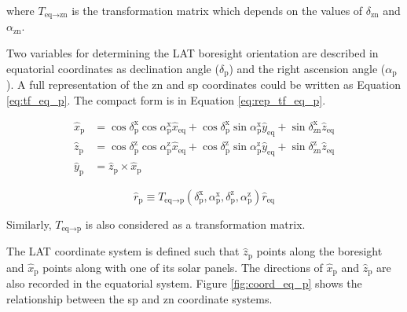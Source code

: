 where $T_{\text{eq}\rightarrow\text{zn}}$ is the transformation matrix which depends on the
values of $\delta_\text{zn}$ and $\alpha_\text{zn}$.


Two variables for determining the LAT boresight
orientation are described 
in equatorial coordinates as declination angle ($\delta_\text{p}$)
and the right ascension angle ($\alpha_\text{p}$).
A full representation of the zn and sp coordinates could
be written as Equation \ref{eq:tf_eq_p}.
The compact form is in Equation \ref{eq:rep_tf_eq_p}.

\begin{equation}
    \begin{split}
    \hat{x}_\text{p} &= \cos\delta^\text{x}_\text{p}\cos\alpha^\text{x}_\text{p}\hat{x}_\text{eq} + \cos\delta^\text{x}_\text{p}\sin\alpha^\text{x}_\text{p}\hat{y}_\text{eq} + \sin\delta^\text{x}_\text{zn}\hat{z}_\text{eq}\\
    \hat{z}_\text{p} &= \cos\delta^\text{z}_\text{p}\cos\alpha^\text{z}_\text{p}\hat{x}_\text{eq} + \cos\delta^\text{z}_\text{p}\sin\alpha^\text{z}_\text{p}\hat{y}_\text{eq} + \sin\delta^\text{z}_\text{zn}\hat{z}_\text{eq}\\
    \hat{y}_\text{p} &= \hat{z}_\text{p} \times \hat{x}_\text{p}
    \end{split}
    \label{eq:tf_eq_p}
\end{equation}

\begin{equation}
    \hat{r}_\text{p} \equiv T_{\text{eq}\rightarrow\text{p}} (\delta^\text{x}_\text{p}, \alpha^\text{x}_\text{p}, \delta^\text{z}_\text{p}, \alpha^\text{z}_\text{p}) \hat{r}_\text{eq}
    \label{eq:rep_tf_eq_p}
\end{equation}

Similarly, $T_{\text{eq}\rightarrow\text{p}}$ is also considered as 
a transformation matrix.



The LAT coordinate system is defined such that $\hat{z}_\text{p}$
points along the boresight and $\hat{x}_\text{p}$ points
along with one of its solar panels.
The directions of $\hat{x}_\text{p}$ and $\hat{z}_\text{p}$
are also recorded in the
equatorial system. Figure \ref{fig:coord_eq_p} shows the
relationship between the sp and zn coordinate systems.

